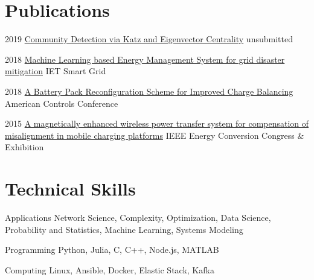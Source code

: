 \documentclass{tccv}
\begin{document}
\section{Publications}
\begin{yearlist}
	\item{2019}
	{\href{https://arxiv.org/abs/1909.03916}{Community Detection via Katz and Eigenvector Centrality}}
	{unsubmitted}
	
	\item{2018}
	{\href{https://digital-library.theiet.org/content/journals/10.1049/iet-stg.2018.0043}{Machine Learning based Energy Management System for grid disaster mitigation}}
	{IET Smart Grid}
	
	\item{2018}
	{\href{https://ieeexplore.ieee.org/document/8431612}{A Battery Pack Reconfiguration Scheme for Improved Charge Balancing}}
	{American Controls Conference}
	
	\item{2015}
	{\href{http://ieeexplore.ieee.org/document/7309840/}{A magnetically enhanced wireless power transfer system for compensation of misalignment in mobile charging platforms}}
	{IEEE Energy Conversion Congress \& Exhibition}
	
\end{yearlist}

\section{Technical Skills}

\begin{factlist}
\item {Applications}
	{Network Science, Complexity, Optimization, Data Science, Probability and Statistics, Machine Learning, Systems Modeling}

\item{Programming}
    {Python, Julia, C, C++, Node.js, MATLAB}
    
\item{Computing}
     {Linux, Ansible, Docker, Elastic Stack, Kafka}



\end{factlist}
\end{document}

